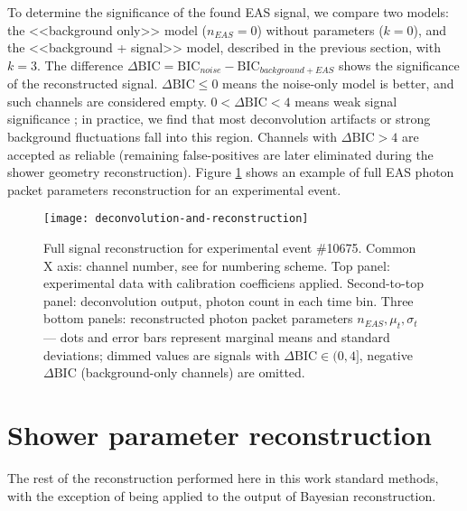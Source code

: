 To determine the significance of the found EAS signal, we compare two models: the <<background only>> model ($n_{EAS} = 0$) without parameters ($k=0$), and the <<background + signal>> model, described in the previous section, with $k=3$. The difference $ \Delta \mathrm{BIC} = \mathrm{BIC}_{noise} - \mathrm{BIC}_{background + EAS}$ shows the significance of the reconstructed signal. $\Delta \mathrm{BIC} \leq 0$ means the noise-only model is better, and such channels are considered empty. $0 < \Delta \mathrm{BIC} < 4$ means weak signal significance \cite{Kass1995}; in practice, we find that most deconvolution artifacts or strong background fluctuations fall into this region. Channels with $\Delta \mathrm{BIC} > 4$ are accepted as reliable (remaining false-positives are later eliminated during the shower geometry reconstruction). Figure \ref{pic:deconvolution-and-reconstruction} shows an example of full EAS photon packet parameters reconstruction for an experimental event.

\begin{figure}
	\centering
	\texttt{[image: deconvolution-and-reconstruction]}
	\caption{Full signal reconstruction for experimental event \#10675. Common X axis: channel number, see \cite{SphereCalibration2016} for numbering scheme. Top panel: experimental data with calibration coefficiens applied. Second-to-top panel: deconvolution output, photon count in each time bin. Three bottom panels: reconstructed photon packet parameters $n_{EAS}, \mu_t, \sigma_t$ --- dots and error bars represent marginal means and standard deviations; dimmed values are signals with $\Delta \mathrm{BIC} \in (0, 4]$, negative $\Delta \mathrm{BIC}$ (background-only channels) are omitted.}
	\label{pic:deconvolution-and-reconstruction}
\end{figure}


\section{Shower parameter reconstruction}

The rest of the reconstruction performed here in this work standard methods, with the exception of being applied to the output of Bayesian reconstruction.

